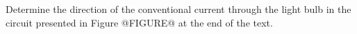 Determine the direction of the conventional current through the light bulb 
in the circuit presented in Figure @FIGURE@ at the end of the text.